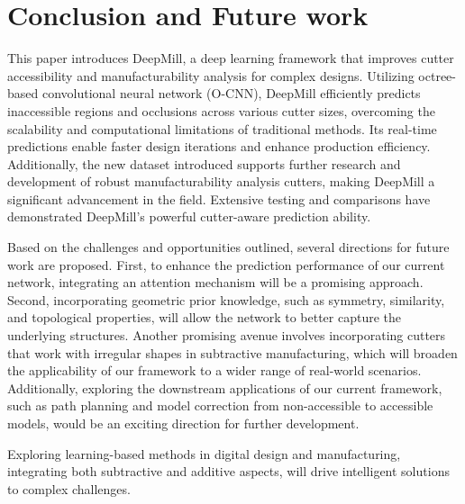 
\section{Conclusion and Future work}
\label{sec:conclusion}
This paper introduces DeepMill, a deep learning framework that improves cutter accessibility and manufacturability analysis for complex designs. Utilizing octree-based convolutional neural network (O-CNN), DeepMill efficiently predicts inaccessible regions and occlusions across various cutter sizes, overcoming the scalability and computational limitations of traditional methods. Its real-time predictions enable faster design iterations and enhance production efficiency. Additionally, the new dataset introduced supports further research and development of robust manufacturability analysis cutters, making DeepMill a significant advancement in the field. 
Extensive testing and comparisons have demonstrated DeepMill's powerful cutter-aware prediction ability.







Based on the challenges and opportunities outlined, several directions for future work are proposed. First, to enhance the prediction performance of our current network, integrating an attention mechanism will be a promising approach. 
Second, incorporating geometric prior knowledge, such as symmetry, similarity, and topological properties, will allow the network to better capture the underlying structures.
%
Another promising avenue involves incorporating cutters that work with irregular shapes in subtractive manufacturing, which will broaden the applicability of our framework to a wider range of real-world scenarios.
Additionally, exploring the downstream applications of our current framework, such as path planning and model correction from non-accessible to accessible models, would be an exciting direction for further development.

Exploring learning-based methods in digital design and manufacturing, integrating both subtractive and additive aspects, will drive intelligent solutions to complex challenges.

